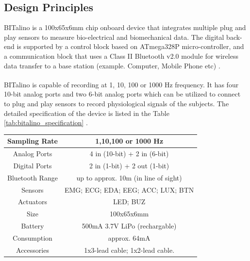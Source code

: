 \subsection{Design Principles} BITalino is a 100x65x6mm chip onboard device that integrates multiple plug and play sensors to measure bio-electrical and biomechanical data. The digital back-end is supported by a control block based on ATmega328P micro-controller, and a communication block that uses a Class II Bluetooth v2.0 module for wireless data transfer to a base station (example. Computer, Mobile Phone etc) \cite{silva_bitalino:_2014}.

\paragraph{} BITalino is capable of recording at 1, 10, 100 or 1000 Hz frequency. It has four 10-bit analog ports and two 6-bit analog ports which can be utilized to connect to plug and play sensors to record physiological signals of the subjects. The detailed specification of the device is listed in the Table \ref{tab:bitalino_specification} \cite{bitalino_datasheet}.

\begin{center}
\begin{tabular}{ |c|c| }
\hline
Sampling Rate & 1,10,100 or 1000 Hz \\
\hline
Analog Ports & 4 in (10-bit) + 2 in (6-bit) \\
\hline
Digital Ports & 2 in (1-bit) + 2 out (1-bit) \\
\hline
Bluetooth Range & up to approx. 10m (in line of sight) \\
\hline
Sensors & EMG; ECG; EDA; EEG; ACC; LUX; BTN \\
\hline
Actuators & LED; BUZ \\
\hline
Size & 100x65x6mm \\
\hline
Battery & 500mA 3.7V LiPo (rechargable) \\
\hline
Consumption & approx. 64mA \\
\hline
Accessories & 1x3-lead cable; 1x2-lead cable. \\
\hline
\end{tabular}
\label{tab:bitalino_specification}
\end{center}

